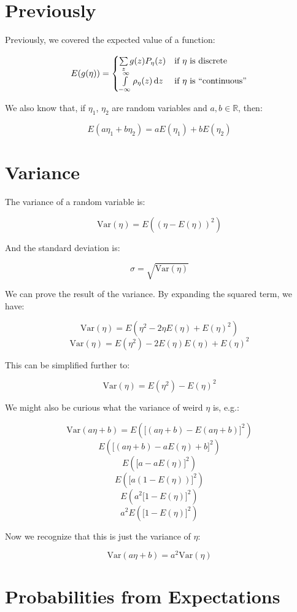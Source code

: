 \documentclass{article}
\renewcommand{\d}[1]{\,\textnormal{d}#1}
\begin{document}
\section*{Previously}

Previously, we covered the expected value of a function:

\[
E(g(\eta))=\begin{cases}
\sum\limits_z g(z)P_\eta(z) & \text{if $\eta$ is discrete} \\
\int\limits_{-\infty}^\infty \rho_\eta(z) \d{z} & \text{if $\eta$ is ``continuous''} \\
\end{cases}
\]

We also know that, if $\eta_1$, $\eta_2$ are random variables and
$a,b\in\mathbb{R}$, then:

\[
E(a\eta_1+b\eta_2)=aE(\eta_1)+bE(\eta_2)
\]

\section*{Variance}

The variance of a random variable is:

\[
\text{Var}(\eta)=E((\eta-E(\eta))^2)
\]

And the standard deviation is:

\[
\sigma=\sqrt{\text{Var}(\eta)}
\]

We can prove the result of the variance. By expanding the squared
term, we have:

\[
\text{Var}(\eta)=E(\eta^2-2\eta E(\eta)+E(\eta)^2)
\] \[
\text{Var}(\eta)=E(\eta^2)-2E(\eta)E(\eta)+E(\eta)^2
\]

This can be simplified further to:

\[
\text{Var}(\eta)=E(\eta^2)-E(\eta)^2
\]

We might also be curious what the variance of weird $\eta$ is, e.g.:

\[
\text{Var}(a\eta+b)=E(\lbrack(a\eta+b)-E(a\eta+b)\rbrack^2)
\] \[
E(\lbrack(a\eta+b)-aE(\eta)+b\rbrack^2)
\] \[
E(\lbrack a-aE(\eta)\rbrack^2)
\] \[
E(\lbrack a(1-E(\eta))\rbrack^2)
\] \[
E(a^2 \lbrack1-E(\eta)\rbrack^2)
\] \[
a^2 E(\lbrack 1-E(\eta)\rbrack^2)
\]

Now we recognize that this is just the variance of $\eta$:

\[
\text{Var}(a\eta+b)=a^2\text{Var}(\eta)
\]

\section*{Probabilities from Expectations}
\end{document}
